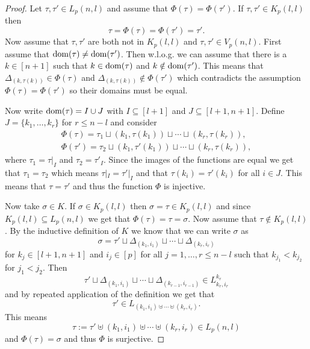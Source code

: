 \begin{proof}
    Let $\tau, \tau' \in L_p(n,l)$ and assume that $\Phi(\tau) = \Phi(\tau')$. If $\tau, \tau' \in K_p(l,l)$ then \[\tau = \Phi(\tau) = \Phi(\tau') = \tau'.\] Now assume that $\tau, \tau'$ are both not in $K_p(l,l)$ and $\tau, \tau' \in V_p(n, l)$. First assume that ${\rm dom}(\tau) \neq {\rm dom}(\tau')$. Then w.l.o.g. we can assume that there is a $k\in [n+1]$ such that $k \in {\rm dom}(\tau)$ and $k \notin {\rm dom}(\tau')$. This means that $\Delta_{(k,\tau(k))}\in \Phi(\tau)$ and $\Delta_{(k,\tau(k))}\notin \Phi(\tau')$ which contradicts the assumption $\Phi(\tau) = \Phi(\tau')$ so their domains must be equal.

    Now write ${\rm dom}(\tau) = I \cup J$ with $I \subseteq [l+1]$ and $J \subseteq [l+1,n+1]$. Define $J = \{k_1, \ldots, k_r\}$ for $r \leq n-l$ and consider
    \begin{align*}
      \Phi(\tau) = \tau_1 \sqcup (k_1, \tau(k_1)) \sqcup \cdots \sqcup (k_r, \tau(k_r)), \\
      \Phi(\tau') = \tau_2 \sqcup (k_1, \tau'(k_1)) \sqcup \cdots \sqcup (k_r, \tau(k_r)),
    \end{align*}
    where $\tau_1 = \tau|_I$ and $\tau_2 = \tau'_I$. Since the images of the functions are equal we get that $\tau_1 = \tau_2$ which means $\tau|_I = \tau'|_I$ and that $\tau(k_i) = \tau'(k_i)$ for all $i \in J$. This means that $\tau = \tau'$ and thus the function $\Phi$ is injective.

    Now take $\sigma \in K$. If $\sigma \in K_p(l,l)$ then $\sigma = \tau \in K_p(l,l)$ and since $K_p(l,l) \subseteq L_p(n,l)$ we get that $\Phi(\tau) = \tau = \sigma$. Now assume that $\tau \notin K_p(l,l)$. By the inductive definition of $K$ we know that we can write $\sigma$ as \[\sigma = \tau' \sqcup \Delta_{(k_1,i_1)} \sqcup \cdots \sqcup \Delta_{(k_r,i_r)}\] for $k_j \in [l+1,n+1]$ and $i_j \in [p]$ for all $j = 1,\ldots,r \leq n-l$ such that $k_{j_1} < k_{j_2}$ for $j_1 < j_2$. Then \[ \tau' \sqcup \Delta_{(k_1,i_1)} \sqcup \cdots \sqcup \Delta_{(k_{r-1},i_{r-1})}\in L^{k_r}_{k_r, i_r}\] and by repeated application of the definition we get that \[\tau' \in L_{(k_1,i_1)\uplus\cdots\uplus(k_r,i_r)}.\] This means \[\tau := \tau' \uplus (k_1, i_1) \uplus \cdots \uplus (k_r,i_r) \in L_p(n,l)\] and $\Phi(\tau) = \sigma$ and thus $\Phi$ is surjective.


\end{proof}
